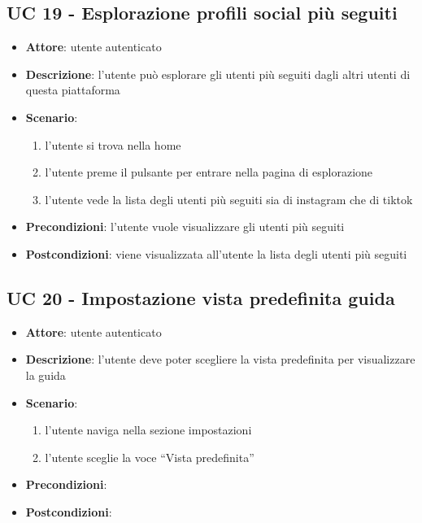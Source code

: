 \subsection{UC 19 - Esplorazione profili social più seguiti}
\begin{itemize}
    \item \textbf{Attore}: utente autenticato
    \item \textbf{Descrizione}: l’utente può esplorare gli utenti più seguiti dagli altri utenti di questa piattaforma
    \item \textbf{Scenario}: 
        \begin{enumerate}
            \item l’utente si trova nella home
            \item l’utente preme il pulsante per entrare nella pagina di esplorazione
            \item l’utente vede la lista degli utenti più seguiti sia di instagram che di tiktok
        \end{enumerate}
    \item \textbf{Precondizioni}: l’utente vuole visualizzare gli utenti più seguiti
    \item \textbf{Postcondizioni}: viene visualizzata all’utente la lista degli utenti più seguiti
\end{itemize}

\subsection{UC 20 - Impostazione vista predefinita guida}
\begin{itemize}
    \item \textbf{Attore}: utente autenticato
    \item \textbf{Descrizione}: l’utente deve poter scegliere la vista predefinita per visualizzare la guida
    \item \textbf{Scenario}: 
        \begin{enumerate}
            \item l’utente naviga nella sezione impostazioni
            \item l’utente sceglie la voce “Vista predefinita”
        \end{enumerate}
    \item \textbf{Precondizioni}:
    \item \textbf{Postcondizioni}:
\end{itemize}

